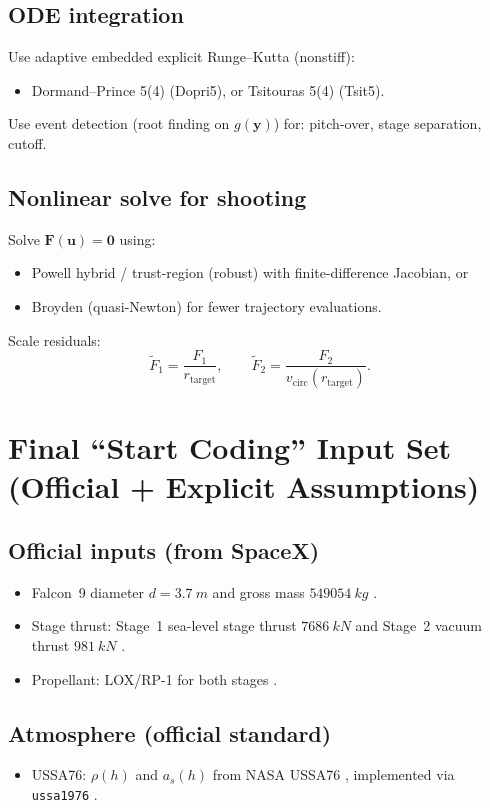 \documentclass[11pt]{article}
\begin{document}
\subsection{ODE integration}
Use adaptive embedded explicit Runge--Kutta (nonstiff):
\begin{itemize}
\item Dormand--Prince 5(4) (Dopri5), or Tsitouras 5(4) (Tsit5).
\end{itemize}
Use event detection (root finding on $g(\bm{y})$) for: pitch-over, stage separation, cutoff.

\subsection{Nonlinear solve for shooting}
Solve $\bm{F}(\bm{u})=\bm{0}$ using:
\begin{itemize}
\item Powell hybrid / trust-region (robust) with finite-difference Jacobian, or
\item Broyden (quasi-Newton) for fewer trajectory evaluations.
\end{itemize}
Scale residuals:
\[
\tilde F_1=\frac{F_1}{r_{\text{target}}},\qquad \tilde F_2=\frac{F_2}{v_{\text{circ}}(r_{\text{target}})}.
\]

\section{Final ``Start Coding'' Input Set (Official + Explicit Assumptions)}
\subsection{Official inputs (from SpaceX)}
\begin{itemize}
\item Falcon~9 diameter $d=\SI{3.7}{m}$ and gross mass $\SI{549054}{kg}$ \cite{SpaceX_F9_Web}.
\item Stage thrust: Stage~1 sea-level stage thrust $\SI{7686}{kN}$ and Stage~2 vacuum thrust $\SI{981}{kN}$ \cite{SpaceX_UsersGuide_2025}.
\item Propellant: LOX/RP-1 for both stages \cite{SpaceX_UsersGuide_2025}.
\end{itemize}

\subsection{Atmosphere (official standard)}
\begin{itemize}
\item USSA76: $\rho(h)$ and $a_s(h)$ from NASA USSA76 \cite{NASA_USSA76}, implemented via \texttt{ussa1976} \cite{PyPI_USSA1976,USSA1976_Docs}.
\end{itemize}
\end{document}
